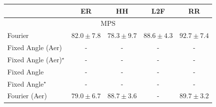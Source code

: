 \begin{tabular}{l|cccc|}
\toprule
            & ER & HH & L2F & RR \\
\midrule
\multicolumn{5}{c}{\rule{0pt}{8pt}MPS} \\
\midrule
Fourier & {\cellcolor[HTML]{FEECA5}} \color[HTML]{000000} $82.0\pm 7.8$ & {\cellcolor[HTML]{FFFEE1}} \color[HTML]{000000} $78.3\pm 9.7$ & {\cellcolor[HTML]{FB9326}} \color[HTML]{000000} $88.6\pm 4.3$ & {\cellcolor[HTML]{D45507}} \color[HTML]{F1F1F1} $92.7\pm 7.4$ \\
Fixed Angle (Aer) & {\cellcolor[HTML]{000000}} \color[HTML]{F1F1F1} {\cellcolor{white}} \color{black} - & {\cellcolor[HTML]{000000}} \color[HTML]{F1F1F1} {\cellcolor{white}} \color{black} - & {\cellcolor[HTML]{000000}} \color[HTML]{F1F1F1} {\cellcolor{white}} \color{black} - & {\cellcolor[HTML]{000000}} \color[HTML]{F1F1F1} {\cellcolor{white}} \color{black} - \\
Fixed Angle (Aer)$^\star$ & {\cellcolor[HTML]{000000}} \color[HTML]{F1F1F1} {\cellcolor{white}} \color{black} - & {\cellcolor[HTML]{000000}} \color[HTML]{F1F1F1} {\cellcolor{white}} \color{black} - & {\cellcolor[HTML]{000000}} \color[HTML]{F1F1F1} {\cellcolor{white}} \color{black} - & {\cellcolor[HTML]{000000}} \color[HTML]{F1F1F1} {\cellcolor{white}} \color{black} - \\
Fixed Angle & {\cellcolor[HTML]{000000}} \color[HTML]{F1F1F1} {\cellcolor{white}} \color{black} - & {\cellcolor[HTML]{000000}} \color[HTML]{F1F1F1} {\cellcolor{white}} \color{black} - & {\cellcolor[HTML]{000000}} \color[HTML]{F1F1F1} {\cellcolor{white}} \color{black} - & {\cellcolor[HTML]{000000}} \color[HTML]{F1F1F1} {\cellcolor{white}} \color{black} - \\
Fixed Angle$^\star$ & {\cellcolor[HTML]{000000}} \color[HTML]{F1F1F1} {\cellcolor{white}} \color{black} - & {\cellcolor[HTML]{000000}} \color[HTML]{F1F1F1} {\cellcolor{white}} \color{black} - & {\cellcolor[HTML]{000000}} \color[HTML]{F1F1F1} {\cellcolor{white}} \color{black} - & {\cellcolor[HTML]{000000}} \color[HTML]{F1F1F1} {\cellcolor{white}} \color{black} - \\
Fourier (Aer) & {\cellcolor[HTML]{FFFCD6}} \color[HTML]{000000} $79.0\pm 6.7$ & {\cellcolor[HTML]{FB9225}} \color[HTML]{000000} $88.7\pm 3.6$ & {\cellcolor[HTML]{000000}} \color[HTML]{F1F1F1} {\cellcolor{white}} \color{black} - & {\cellcolor[HTML]{F4811D}} \color[HTML]{F1F1F1} $89.7\pm 3.2$ \\

\end{tabular}
